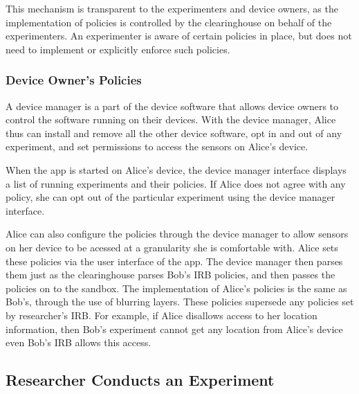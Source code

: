 This mechanism is transparent to the experimenters 
and device owners, as the implementation of policies is controlled by the 
clearinghouse on behalf of the experimenters. An experimenter is aware 
of certain policies in place, but does not need to implement or explicitly
enforce such policies. 

\subsubsection{Device Owner's Policies}\label{sec-alice-policy}
A device manager is a part of the device software that 
allows device owners to control the software running on their 
devices. With the device manager, Alice thus can install and remove 
all the other device software, opt in and out of any experiment, 
and set permissions to access the sensors on Alice's device. 

When the \sysname app is started on Alice's device, the device 
manager interface displays a list of running experiments and their policies. If 
Alice does not agree with any policy, she can opt out of the particular 
experiment using the device manager interface. 

Alice can also configure the policies through the device manager to allow
sensors on her device to be acessed at a granularity she is comfortable with.
Alice sets these policies via the user interface of the \sysname app. 
The device manager then parses them just as the clearinghouse
parses Bob's IRB policies, and then passes the policies on to the sandbox.
The implementation of Alice's policies is the same as Bob's, through
the use of blurring layers.
These policies supersede any policies set by researcher's IRB. For 
example, if Alice disallows access to her location information, then 
Bob's experiment cannot get any location from Alice's device even
Bob's IRB allows this access. 


\subsection{Researcher Conducts an Experiment}\label{sec-emt}

